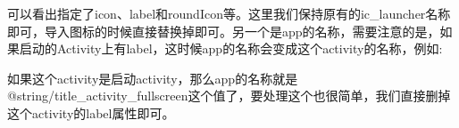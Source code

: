 \documentclass[12pt]{article}
\begin{document}
可以看出指定了icon、label和roundIcon等。这里我们保持原有的ic\_launcher名称即可，导入图标的时候直接替换掉即可。另一个是app的名称，需要注意的是，如果启动的Activity上有label，这时候app的名称会变成这个activity的名称，例如:

\begin{Shaded}
\begin{Highlighting}[]
\NormalTok{\textless{}}
        \NormalTok{\textgreater{}\textless{}/}\NormalTok{\textgreater{}}
\end{Highlighting}
\end{Shaded}

如果这个activity是启动activity，那么app的名称就是@string/title\_activity\_fullscreen这个值了，要处理这个也很简单，我们直接删掉这个activity的label属性即可。
\end{document}
